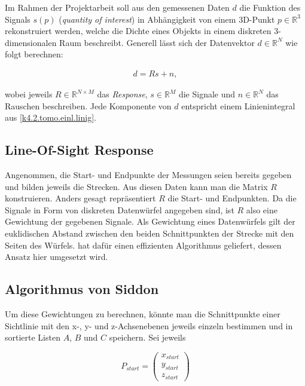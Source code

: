 \documentclass[]{dsadokumentation}
\begin{document}
Im Rahmen der Projektarbeit soll aus den gemessenen Daten $d$ die Funktion des Signals $s(p)$ (\textit{quantity of interest}) in Abhängigkeit von einem 3D-Punkt $p \in \mathbb{R}^3$ rekonstruiert werden, welche die Dichte eines Objekts in einem diskreten 3-dimensionalen Raum beschreibt. Generell lässt sich der Datenvektor $d \in \mathbb{R}^N$ wie folgt berechnen:

\begin{equation}
  \begin{aligned}
    d = Rs + n,
  \end{aligned}
\end{equation}

wobei jeweils $R \in \mathbb{R}^{N \times M}$ das \textit{Response}, $s \in \mathbb{R}^M$ die Signale und $n \in \mathbb{R}^N$ das Rauschen beschreiben. Jede Komponente von $d$ entspricht einem Linienintegral aus \cref{k4.2.tomo.einl.linig}.

\subsection{Line-Of-Sight Response}

Angenommen, die Start- und Endpunkte der Messungen seien bereits gegeben und bilden jeweils die Strecken. Aus diesen Daten kann man die Matrix $R$ konstruieren. Anders gesagt repräsentiert $R$ die Start- und Endpunkten. Da die Signale in Form von diskreten Datenwürfel angegeben sind, ist $R$ also eine Gewichtung der gegebenen Signale. Als Gewichtung eines Datenwürfels gilt der euklidischen Abstand zwischen den beiden Schnittpunkten der Strecke mit den Seiten des Würfels. \textcite{k4.2.siddon} hat dafür einen effizienten Algorithmus geliefert, dessen Ansatz hier umgesetzt wird.

\subsection{Algorithmus von Siddon}

Um diese Gewichtungen zu berechnen, könnte man die Schnittpunkte einer Sichtlinie mit den x-, y- und z-Achsenebenen jeweils einzeln bestimmen und in sortierte Listen $A$, $B$ und $C$ speichern. Sei jeweils

\begin{equation}
  P_{start} = \begin{pmatrix}x_{start} \\ y_{start} \\ z_{start}\end{pmatrix}
\end{equation}
\end{document}
